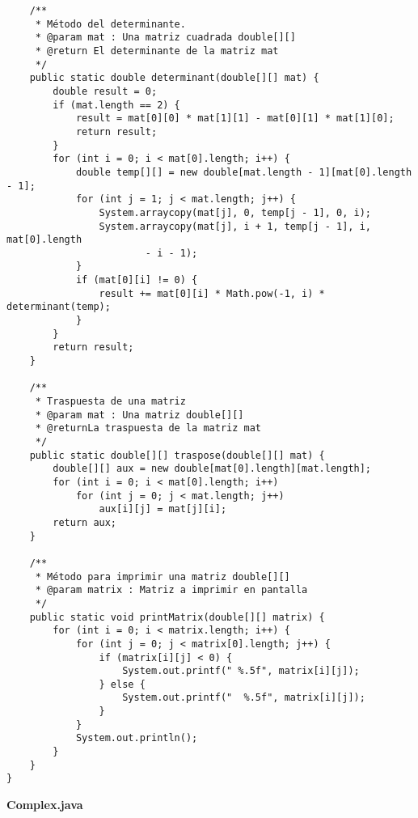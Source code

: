 \documentclass[a4paper,10pt]{article}
\begin{document}
\begin{verbatim}
	/**
	 * Método del determinante.
	 * @param mat : Una matriz cuadrada double[][]
	 * @return El determinante de la matriz mat
	 */
	public static double determinant(double[][] mat) {
		double result = 0;
		if (mat.length == 2) {
			result = mat[0][0] * mat[1][1] - mat[0][1] * mat[1][0];
			return result;
		}
		for (int i = 0; i < mat[0].length; i++) {
			double temp[][] = new double[mat.length - 1][mat[0].length - 1];
			for (int j = 1; j < mat.length; j++) {
				System.arraycopy(mat[j], 0, temp[j - 1], 0, i);
				System.arraycopy(mat[j], i + 1, temp[j - 1], i, mat[0].length
						- i - 1);
			}
			if (mat[0][i] != 0) {
				result += mat[0][i] * Math.pow(-1, i) * determinant(temp);
			}
		}
		return result;
	}

	/**
	 * Traspuesta de una matriz
	 * @param mat : Una matriz double[][]
	 * @returnLa traspuesta de la matriz mat
	 */
	public static double[][] traspose(double[][] mat) {
		double[][] aux = new double[mat[0].length][mat.length];
		for (int i = 0; i < mat[0].length; i++)
			for (int j = 0; j < mat.length; j++)
				aux[i][j] = mat[j][i];
		return aux;
	}
	
	/**
	 * Método para imprimir una matriz double[][]
	 * @param matrix : Matriz a imprimir en pantalla
	 */
	public static void printMatrix(double[][] matrix) {
		for (int i = 0; i < matrix.length; i++) {
			for (int j = 0; j < matrix[0].length; j++) {
				if (matrix[i][j] < 0) {
					System.out.printf(" %.5f", matrix[i][j]);
				} else {
					System.out.printf("  %.5f", matrix[i][j]);
				}
			}
			System.out.println();
		}
	}
}

\end{verbatim}

\begin{center}
\textbf{Complex.java}
\end{center}
\end{document}
